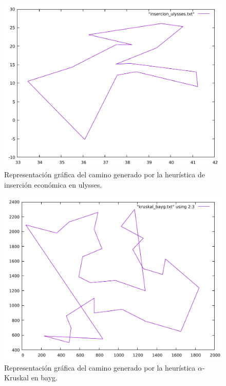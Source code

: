 \begin{figure}[H]
  \centering
  \includegraphics[scale=0.5]{../src/insercion_ulysses.pdf}
  \caption{Representación gráfica del camino generado por la heurística de inserción económica en ulysses.}
\end{figure} 

\begin{figure}[H]
  \centering
  \includegraphics[scale=0.5]{../src/kruskal_bayg.pdf}
  \caption{Representación gráfica del camino generado por la heurística $\alpha$-Kruskal en bayg.}
\end{figure} 